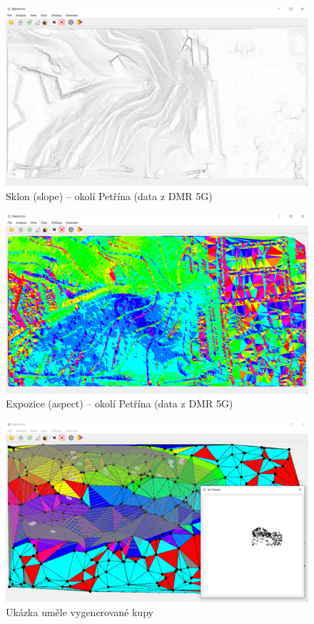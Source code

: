 \begin{figure}[H]
    \centering
    \includegraphics[width=\textwidth]{images/Ukazka_petrin_slope.png}
    \caption{Sklon (slope) – okolí Petřína (data z DMR 5G)}
\end{figure}

\begin{figure}[H]
    \centering
    \includegraphics[width=\textwidth]{images/Ukazka_petrin_aspect.png}
    \caption{Expozice (aspect) – okolí Petřína (data z DMR 5G)}
\end{figure}

\begin{figure}[H]
    \centering
    \includegraphics[width=\textwidth]{images/ukazka_kopec.png}
    \caption{Ukázka uměle vygenerované kupy}
\end{figure}

